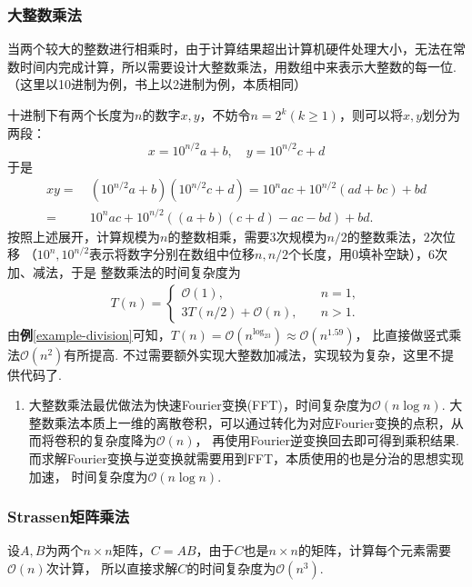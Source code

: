 \documentclass[12pt, a4paper, oneside]{ctexart}
\numberwithin{equation}{section}  %
\theoremstyle{definition}
\newenvironment{remark}{\begin{enumerate}[label=\textbf{注\arabic*.}]}{\end{enumerate}}
\let\geq=\geqslant %
\def\O{\mathcal{O}}         %
\begin{document}
\subsubsection{大整数乘法}
    当两个较大的整数进行相乘时，由于计算结果超出计算机硬件处理大小，无法在常数时间内完成计算，所以需要设计大整数乘法，用数组中来表示大整数的每一位.（这里以10进制为例，书上以2进制为例，本质相同）

    十进制下有两个长度为$n$的数字$x,y$，不妨令$n=2^k(k\geq 1)$，则可以将$x,y$划分为两段：
    \begin{equation*}
        x = 10^{n/2}a+b,\quad y=10^{n/2}c+d
    \end{equation*}
    于是
    \begin{align*}
        xy =&\ (10^{n/2}a+b)(10^{n/2}c+d) = 10^nac+10^{n/2}(ad+bc)+bd\\
        =&\ 10^nac+10^{n/2}((a+b)(c+d)-ac-bd)+bd.
    \end{align*}
    按照上述展开，计算规模为$n$的整数相乘，需要$3$次规模为$n/2$的整数乘法，$2$次位移
    （$10^n,10^{n/2}$表示将数字分别在数组中位移$n,n/2$个长度，用$0$填补空缺），$6$次加、减法，于是
    整数乘法的时间复杂度为
    \begin{eqnarray*}
        T(n) = \begin{cases}
            \O(1),&\quad n=1,\\
            3T(n/2)+\O(n),&\quad n>1.
        \end{cases}
    \end{eqnarray*}
    由\textbf{例}\ref{example-division}可知，$T(n) = \O(n^{\log_23}) \approx \O(n^{1.59})$，
    比直接做竖式乘法$\O(n^2)$有所提高. 不过需要额外实现大整数加减法，实现较为复杂，这里不提供代码了.
    \begin{remark}
        \item 大整数乘法最优做法为快速Fourier变换(FFT)，时间复杂度为$\O(n\log n)$.
        大整数乘法本质上一维的离散卷积，可以通过转化为对应Fourier变换的点积，从而将卷积的复杂度降为$\O(n)$，
        再使用Fourier逆变换回去即可得到乘积结果. 
        而求解Fourier变换与逆变换就需要用到FFT，本质使用的也是分治的思想实现加速，
        时间复杂度为$\O(n\log n)$.
    \end{remark}
\subsubsection{Strassen矩阵乘法}
设$A,B$为两个$n\times n$矩阵，$C = AB$，由于$C$也是$n\times n$的矩阵，计算每个元素需要$\O(n)$次计算，
所以直接求解$C$的时间复杂度为$\O(n^3)$.
\end{document}
